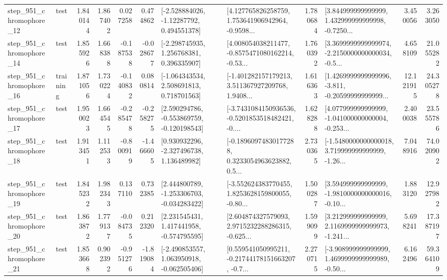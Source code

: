 \begin{tabular}{llrrrrllrlrr}
  step\_951\_chromophore\_12 &      test &      1.840144 &    1.867402 &      0.027258 &  0.474862 &    [-2.528884026, -1.12287792, 0.494551378] &  [4.127765826258759, 1.753641906942964, -0.9598... &       1.780684 &  [3.844999999999999, 1.432999999999998, -0.7250... &            3.450056 &          3.263050 \\
  step\_951\_chromophore\_14 &      test &      1.855926 &    1.668388 &     -0.187538 & -0.028677 &    [-2.298745935, 1.256768381, 0.396335907] &  [4.008054038211477, -0.8575471080162214, -0.53... &       1.760392 &  [3.3699999999999974, -2.2150000000000034, -0.5... &            4.658109 &         21.055282 \\
  step\_951\_chromophore\_16 &  training &      1.871056 &    1.730224 &     -0.140832 &  0.080814 &    [-1.064343534, 2.508691813, 0.718701563] &  [-1.401282157179213, 3.511367927209768, 1.9408... &       1.616363 &  [1.4269999999999996, -3.811, -0.20599999999999... &           12.121915 &         24.305278 \\
  step\_951\_chromophore\_17 &      test &      1.950023 &    1.664545 &     -0.285478 & -0.258275 &   [2.590294786, -0.553869759, -0.120198543] &  [-3.7431084150936536, -0.5201853518482421, -0.... &       1.628288 &  [4.077999999999999, -1.041000000000004, -0.253... &            2.400038 &         23.555786 \\
  step\_951\_chromophore\_18 &      test &      1.913451 &    1.112533 &     -0.800919 & -1.466605 &    [0.930932296, -2.327496738, 1.136489982] &  [-0.18960974830177288, 0.3233054963623882, 0.5... &       2.730365 &  [-1.5480000000000018, 3.719999999999999, -1.26... &            7.048916 &         74.020902 \\
  step\_951\_chromophore\_19 &      test &      1.845232 &    1.982343 &      0.137110 &  0.732385 &   [2.444800789, -1.253306703, -0.034283422] &  [-3.552624383770455, 1.8253628159800055, -0.80... &       1.500287 &  [3.594999999999999, -1.9810000000000016, -0.10... &            1.883120 &         12.927982 \\
  step\_951\_chromophore\_20 &      test &      1.863872 &    1.779137 &     -0.084735 &  0.212320 &    [2.231545431, 1.417441958, -0.574795595] &  [2.604874327579093, 2.9715232288286315, -0.625... &       1.599099 &  [3.212999999999999, 2.1169999999999973, -1.241... &            5.698241 &         17.387197 \\
  step\_951\_chromophore\_21 &      test &      1.853668 &    0.902392 &     -0.951276 & -1.819084 &   [-2.490853557, 1.063950918, -0.062505406] &  [0.559541050995211, -0.21744178151663207, -0.7... &       2.270715 &  [-3.908999999999999, 1.4699999999999989, -0.50... &            6.162496 &         59.364109 \\

\end{tabular}
